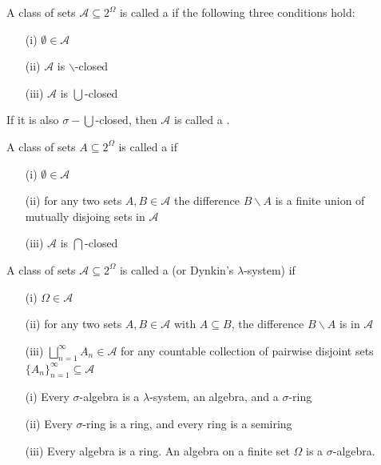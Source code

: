 \documentclass[12pt, a4paper, oneside, openright, titlepage]{book}
\begin{document}
\begin{defn}
    A class of sets $\mathcal{A} \subseteq 2^{\Omega}$ is called a  if the following three conditions hold:  \begin{itemize}
        \item[(i)] $\emptyset \in \mathcal{A}$ 
        \item[(ii)] $\mathcal{A}$ is $\backslash$-closed
        \item[(iii)] $\mathcal{A}$ is $\bigcup$-closed
    \end{itemize}
    If it is also $\sigma-\bigcup$-closed, then $\mathcal{A}$ is called a .
\end{defn}

\begin{defn}
    A class of sets $A\subseteq 2^{\Omega}$ is called a  if  \begin{itemize}
        \item[(i)] $\emptyset \in \mathcal{A}$ 
        \item[(ii)] for any two sets $A,B\in\mathcal{A}$ the difference $B\backslash A$ is a finite union of mutually disjoing sets in $\mathcal{A}$
        \item[(iii)] $\mathcal{A}$ is $\bigcap$-closed
    \end{itemize}
\end{defn}

\begin{defn}
    A class of sets $\mathcal{A} \subseteq 2^{\Omega}$ is called a  (or Dynkin's $\lambda$-system) if  \begin{itemize}
        \item[(i)] $\Omega \in \mathcal{A}$ 
        \item[(ii)] for any two sets $A,B\in\mathcal{A}$ with $A\subseteq B$, the difference $B\backslash A$ is in $\mathcal{A}$
        \item[(iii)] $\bigsqcup_{n=1}^{\infty}A_n \in \mathcal{A}$ for any countable collection of pairwise disjoint sets $\{A_n\}_{n=1}^{\infty} \subseteq \mathcal{A}$
    \end{itemize}
\end{defn}

\begin{thm}
    \leavevmode
    \begin{itemize}
        \item[(i)] Every $\sigma$-algebra is a $\lambda$-system, an algebra, and a $\sigma$-ring
        \item[(ii)] Every $\sigma$-ring is a ring, and every ring is a semiring
        \item[(iii)] Every algebra is a ring. An algebra on a finite set $\Omega$ is a $\sigma$-algebra.
    \end{itemize}
\end{thm}
\end{document}
